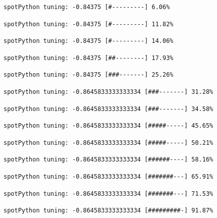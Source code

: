 \documentclass[
  letterpaper,
  DIV=11,
  numbers=noendperiod]{scrreprt}
\begin{document}
\begin{verbatim}
spotPython tuning: -0.84375 [#---------] 6.06% 
\end{verbatim}

\begin{verbatim}
spotPython tuning: -0.84375 [#---------] 11.82% 
\end{verbatim}

\begin{verbatim}
spotPython tuning: -0.84375 [#---------] 14.06% 
\end{verbatim}

\begin{verbatim}
spotPython tuning: -0.84375 [##--------] 17.93% 
\end{verbatim}

\begin{verbatim}
spotPython tuning: -0.84375 [###-------] 25.26% 
\end{verbatim}

\begin{verbatim}
spotPython tuning: -0.8645833333333334 [###-------] 31.28% 
\end{verbatim}

\begin{verbatim}
spotPython tuning: -0.8645833333333334 [###-------] 34.58% 
\end{verbatim}

\begin{verbatim}
spotPython tuning: -0.8645833333333334 [#####-----] 45.65% 
\end{verbatim}

\begin{verbatim}
spotPython tuning: -0.8645833333333334 [#####-----] 50.21% 
\end{verbatim}

\begin{verbatim}
spotPython tuning: -0.8645833333333334 [######----] 58.16% 
\end{verbatim}

\begin{verbatim}
spotPython tuning: -0.8645833333333334 [#######---] 65.91% 
\end{verbatim}

\begin{verbatim}
spotPython tuning: -0.8645833333333334 [#######---] 71.53% 
\end{verbatim}

\begin{verbatim}
spotPython tuning: -0.8645833333333334 [#########-] 91.87% 
\end{verbatim}
\end{document}
